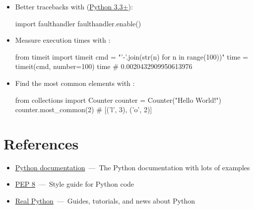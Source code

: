 \documentclass[rules]{cheatsheet}
\begin{document}
\begin{itemize}
  \item Better tracebacks with \href{https://docs.python.org/3/library/faulthandler.html}{} (\href{https://docs.python.org/3/whatsnew/3.3.html}{Python 3.3+}):
  \begin{python}[gobble=4]
    import faulthandler
    faulthandler.enable()
  \end{python}

  \item Measure execution times with \href{https://docs.python.org/3/library/timeit.html#timeit.timeit}{}:
  \begin{python}[gobble=4]
    from timeit import timeit
    cmd = "'-'.join(str(n) for n in range(100))"
    time = timeit(cmd, number=100)
    time # 0.0020432909950613976
  \end{python}

  \item Find the most common elements with \href{https://docs.python.org/3/library/collections.html#collections.Counter}{}:
  \begin{python}[gobble=4]
    from collections import Counter
    counter = Counter("Hello World!")
    counter.most_common(2) # [('l', 3), ('o', 2)]
  \end{python}
\end{itemize}

\section{References}

\begin{itemize}
  \item \href{https://docs.python.org/3/index.html}%
    {Python documentation}~---~The Python documentation with lots of examples
  \item \href{https://www.python.org/dev/peps/pep-0008/}%
    {PEP 8}~---~Style guide for Python code
  \item \href{https://realpython.com/}%
    {Real Python}~---~Guides, tutorials, and news about Python
\end{itemize}
\end{document}
